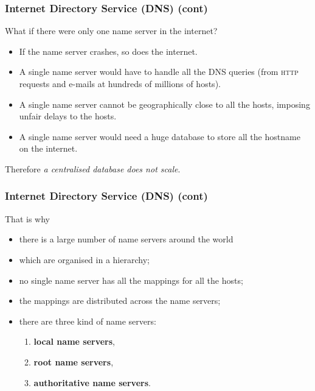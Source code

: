 %
\begin{frame}
\frametitle{Internet Directory Service (DNS) (cont)}

What if there were only one name server in the internet?

\begin{itemize}

  \item If the name server crashes, so does the internet.

  \item A single name server would have to handle all the
  DNS queries (from \textsc{http} requests and e-mails at
  hundreds of millions of hosts).

  \item A single name server cannot be geographically close to all
  the hosts, imposing unfair delays to the hosts.

  \item A single name server would need a huge database to store all
  the hostname on the internet.

\end{itemize}

Therefore \emph{a centralised database does not scale}.

\end{frame}

%
\begin{frame}
\frametitle{Internet Directory Service (DNS) (cont)}

That is why

\begin{itemize}

  \item there is a large number of name servers around the world

  \item which are organised in a hierarchy;

  \item no single name server has all the mappings for all the hosts;

  \item the mappings are distributed across the name servers;

  \item there are three kind of name servers:
  \begin{enumerate}

    \item \textbf{local name servers},

    \item \textbf{root name servers},

    \item \textbf{authoritative name servers}.

  \end{enumerate}

\end{itemize}

\end{frame}

